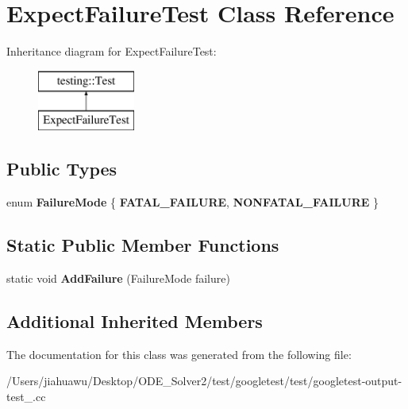 \hypertarget{class_expect_failure_test}{}\section{Expect\+Failure\+Test Class Reference}
\label{class_expect_failure_test}
Inheritance diagram for Expect\+Failure\+Test\+:\begin{figure}[H]
\begin{center}
\leavevmode
\includegraphics[height=2.000000cm]{class_expect_failure_test}
\end{center}
\end{figure}
\subsection*{Public Types}
\begin{DoxyCompactItemize}
\item 
\mbox{\label{class_expect_failure_test_aad05da10bb15d21a434eba3b37011406}} 
enum {\bfseries Failure\+Mode} \{ {\bfseries F\+A\+T\+A\+L\+\_\+\+F\+A\+I\+L\+U\+RE}, 
{\bfseries N\+O\+N\+F\+A\+T\+A\+L\+\_\+\+F\+A\+I\+L\+U\+RE}
 \}
\end{DoxyCompactItemize}
\subsection*{Static Public Member Functions}
\begin{DoxyCompactItemize}
\item 
\mbox{\label{class_expect_failure_test_ab9aeb7820ff7953fc2975ecc5abd046b}} 
static void {\bfseries Add\+Failure} (Failure\+Mode failure)
\end{DoxyCompactItemize}
\subsection*{Additional Inherited Members}


The documentation for this class was generated from the following file\+:\begin{DoxyCompactItemize}
\item 
/\+Users/jiahuawu/\+Desktop/\+O\+D\+E\+\_\+\+Solver2/test/googletest/test/googletest-\/output-\/test\+\_\+.\+cc\end{DoxyCompactItemize}
